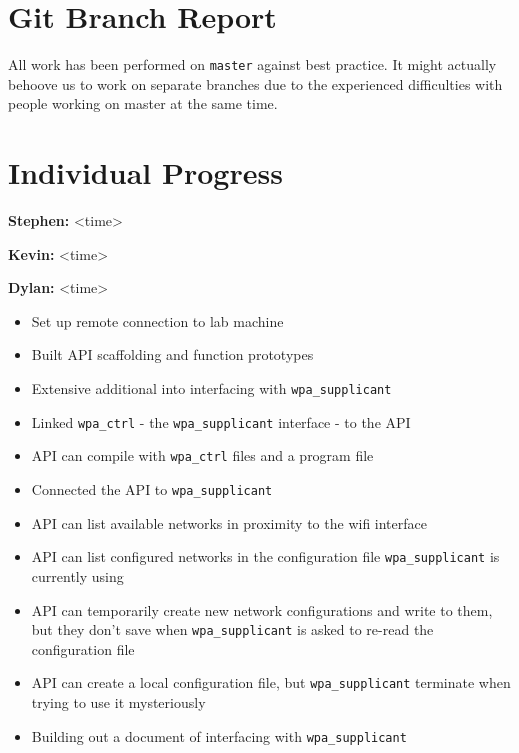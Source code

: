 \documentclass[11pt]{article}
\begin{document}
\section{Git Branch Report}
All work has been performed on \texttt{master} against best practice. It might actually behoove us to
work on separate branches due to the experienced difficulties with people working on master at the same
time.


\section{Individual Progress}

\textbf{Stephen:} <time>
\begin{itemize}

\end{itemize}


\textbf{Kevin:} <time>
\begin{itemize}

\end{itemize}


\textbf{Dylan:} <time>
\begin{itemize}
  \item Set up remote connection to lab machine
  \item Built API scaffolding and function prototypes
  \item Extensive additional into interfacing with \texttt{wpa\_supplicant}
  \item Linked \texttt{wpa\_ctrl} - the \texttt{wpa\_supplicant} interface - to the API
  \item API can compile with \texttt{wpa\_ctrl} files and a program file
  \item Connected the API to \texttt{wpa\_supplicant}
  \item API can list available networks in proximity to the wifi interface
  \item API can list configured networks in the configuration file \texttt{wpa\_supplicant} is currently using
  \item API can temporarily create new network configurations and write to them, but they don't save when 
    \texttt{wpa\_supplicant} is asked to re-read the configuration file
  \item API can create a local configuration file, but \texttt{wpa\_supplicant} terminate when trying to use it mysteriously
  \item Building out a document of interfacing with \texttt{wpa\_supplicant}
\end{itemize}
\end{document}
